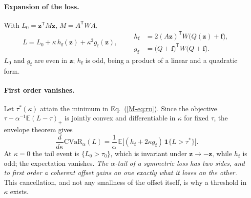 \documentclass[aps,pra,onecolumn,notitlepage,superscriptaddress,nofootinbib,floatfix]{revtex4-2}
\newcommand{\cvar}{\mathrm{CVaR}}
\newcommand{\E}{\mathbb{E}}
\begin{document}
\paragraph*{Expansion of the loss.} With $L_0=\mathbf z^{\mathsf T}M\mathbf z$,
$M=A^{\mathsf T}WA$,
\begin{equation}
L=L_0+\kappa\,h_{\mathbf f}(\mathbf z)+\kappa^2g_{\mathbf f}(\mathbf z),\qquad
\begin{aligned}
h_{\mathbf f}&=2(A\mathbf z)^{\mathsf T}W\big(Q(\mathbf z)+\mathbf f\big),\\
g_{\mathbf f}&=\big(Q+\mathbf f\big)^{\mathsf T}W\big(Q+\mathbf f\big).
\end{aligned}
\label{eq:Lexp}
\end{equation}
$L_0$ and $g_{\mathbf f}$ are even in $\mathbf z$; $h_{\mathbf f}$ is odd,
being a product of a linear and a quadratic form.

\paragraph*{First order vanishes.} Let $\tau^\ast(\kappa)$ attain the minimum
in Eq.~(\ref{M-eq:ru}). Since the objective
$\tau+\alpha^{-1}\E(L-\tau)_+$ is jointly convex and differentiable in
$\kappa$ for fixed $\tau$, the envelope theorem gives
\begin{equation}
\frac{d}{d\kappa}\cvar_\alpha(L)=\frac1\alpha\,\E\big[(h_{\mathbf f}+2\kappa g_{\mathbf f})\,\mathbf 1\{L>\tau^\ast\}\big].
\label{eq:env}
\end{equation}
At $\kappa=0$ the tail event is $\{L_0>\tau_0\}$, which is invariant under
$\mathbf z\to-\mathbf z$, while $h_{\mathbf f}$ is odd; the expectation
vanishes. \emph{The $\alpha$-tail of a symmetric loss has two sides, and to
first order a coherent offset gains on one exactly what it loses on the
other.} This cancellation, and not any smallness of the offset itself, is why
a threshold in $\kappa$ exists.
\end{document}

